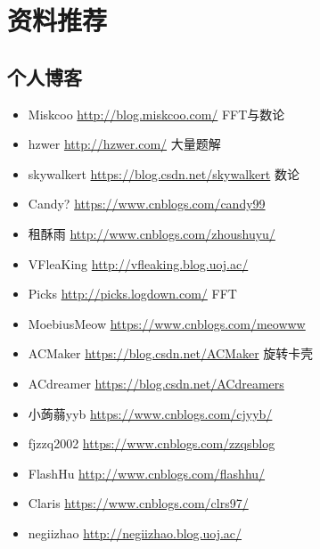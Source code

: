 \chapter{资料推荐}
\section{个人博客}
\begin{itemize}
	\item Miskcoo \url{http://blog.miskcoo.com/} FFT与数论
	\item hzwer \url{http://hzwer.com/} 大量题解
    \item skywalkert \url{https://blog.csdn.net/skywalkert} 数论
    \item Candy? \url{https://www.cnblogs.com/candy99}
    \item 租酥雨 \url{http://www.cnblogs.com/zhoushuyu/}
    \item VFleaKing \url{http://vfleaking.blog.uoj.ac/}
    \item Picks \url{http://picks.logdown.com/} FFT
    \item MoebiusMeow \url{https://www.cnblogs.com/meowww}
    \item ACMaker \url{https://blog.csdn.net/ACMaker} 旋转卡壳
    \item ACdreamer \url{https://blog.csdn.net/ACdreamers}
    \item 小蒟蒻yyb \url{https://www.cnblogs.com/cjyyb/}
    \item fjzzq2002 \url{https://www.cnblogs.com/zzqsblog}
    \item FlashHu \url{http://www.cnblogs.com/flashhu/}
    \item Claris \url{https://www.cnblogs.com/clrs97/}
    \item negiizhao \url{http://negiizhao.blog.uoj.ac/}
\end{itemize}
